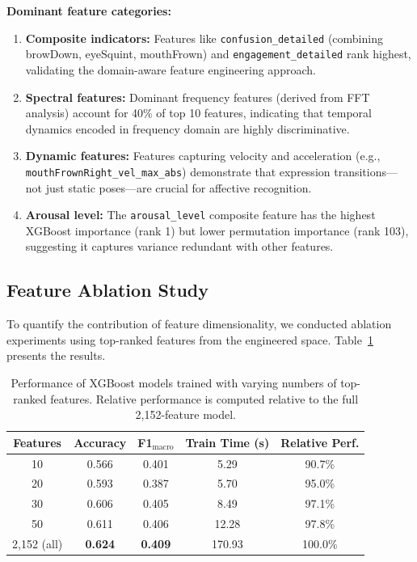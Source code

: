 \textbf{Dominant feature categories:}
\begin{enumerate}
    \item \textbf{Composite indicators:} Features like \texttt{confusion\_detailed} (combining browDown, eyeSquint, mouthFrown) and \texttt{engagement\_detailed} rank highest, validating the domain-aware feature engineering approach.

    \item \textbf{Spectral features:} Dominant frequency features (derived from FFT analysis) account for 40\% of top 10 features, indicating that temporal dynamics encoded in frequency domain are highly discriminative.

    \item \textbf{Dynamic features:} Features capturing velocity and acceleration (e.g., \texttt{mouthFrownRight\_vel\_max\_abs}) demonstrate that expression transitions---not just static poses---are crucial for affective recognition.

    \item \textbf{Arousal level:} The \texttt{arousal\_level} composite feature has the highest XGBoost importance (rank 1) but lower permutation importance (rank 103), suggesting it captures variance redundant with other features.
\end{enumerate}

\subsection{Feature Ablation Study}
\label{sec:feature-ablation}

To quantify the contribution of feature dimensionality, we conducted ablation experiments using top-ranked features from the engineered space. Table~\ref{tab:ablation-results} presents the results.

\begin{table}[t]
\centering
\caption{Performance of XGBoost models trained with varying numbers of top-ranked features. Relative performance is computed relative to the full 2,152-feature model.}
\label{tab:ablation-results}
\begin{tabular}{ccccc}
\toprule
\textbf{Features} & \textbf{Accuracy} & \textbf{F1$_{\text{macro}}$} & \textbf{Train Time (s)} & \textbf{Relative Perf.} \\
\midrule
10 & 0.566 & 0.401 & 5.29 & 90.7\% \\
20 & 0.593 & 0.387 & 5.70 & 95.0\% \\
30 & 0.606 & 0.405 & 8.49 & 97.1\% \\
50 & 0.611 & 0.406 & 12.28 & 97.8\% \\
2,152 (all) & \textbf{0.624} & \textbf{0.409} & 170.93 & 100.0\% \\
\bottomrule
\end{tabular}
\end{table}

